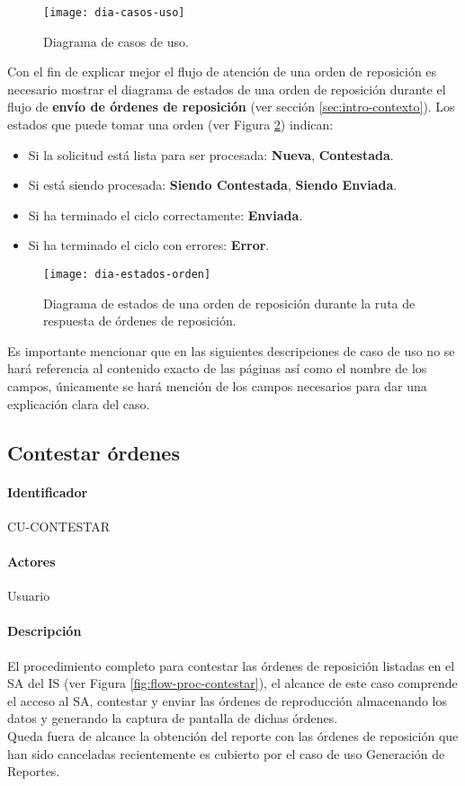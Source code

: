 \begin{figure}[h]
  \centering
  \texttt{[image: dia-casos-uso]} 
  \caption{Diagrama de casos de uso.}
  \label{fig:dia-casos-uso}
\end{figure}

Con el fin de explicar mejor el flujo de atención de una orden de reposición es necesario mostrar el diagrama de estados de una orden de reposición durante el flujo de \textbf{envío de órdenes de reposición} (ver sección \ref{sec:intro-contexto}). Los estados que puede tomar una orden (ver Figura \ref{fig:dia-estados-orden}) indican:
\begin{itemize}
  \item Si la solicitud está lista para ser procesada: \textbf{Nueva}, \textbf{Contestada}.
  \item Si está siendo procesada: \textbf{Siendo Contestada}, \textbf{Siendo Enviada}.
  \item Si ha terminado el ciclo correctamente: \textbf{Enviada}.
  \item Si ha terminado el ciclo con errores: \textbf{Error}.
\end{itemize} 

\begin{figure}[h]
  \centering
  \texttt{[image: dia-estados-orden]} 
  \caption{Diagrama de estados de una orden de reposición durante la ruta de respuesta de órdenes de reposición.}
  \label{fig:dia-estados-orden}
\end{figure}

Es importante mencionar que en las siguientes descripciones de caso de uso no se hará referencia al contenido exacto de las páginas así como el nombre de los campos, únicamente se hará mención de los campos necesarios para dar una explicación clara del caso.

\subsection{Contestar órdenes}
\paragraph*{Identificador}
CU-CONTESTAR
\paragraph*{Actores}
Usuario
\paragraph*{Descripción}
El procedimiento completo para contestar las órdenes de reposición listadas en el SA del IS (ver Figura \ref{fig:flow-proc-contestar}), el alcance de este caso comprende el acceso al SA, contestar y enviar las órdenes de reproducción almacenando los datos y generando la captura de pantalla de dichas órdenes.\\
Queda fuera de alcance la obtención del reporte con las órdenes de reposición que han sido canceladas recientemente es cubierto por el caso de uso Generación de Reportes.
